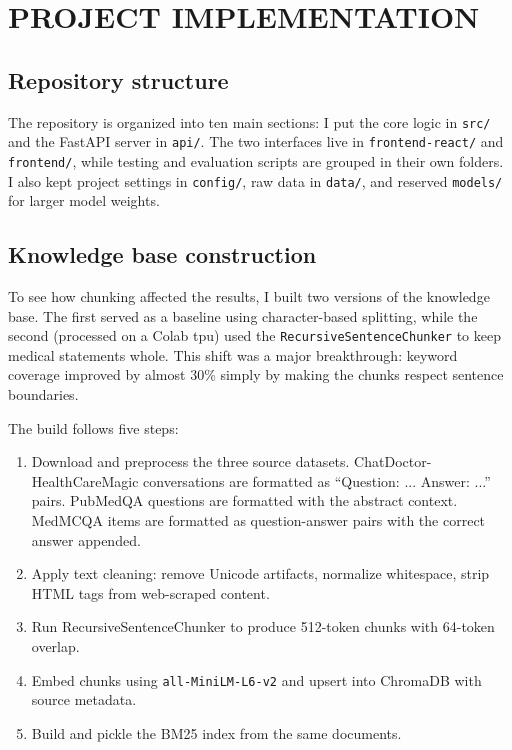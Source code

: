 \chapter{\MakeUppercase{Project Implementation}}

\section{Repository structure}

The repository is organized into ten main sections: 
I put the core logic in \texttt{src/} and the FastAPI server in \texttt{api/}. The two interfaces live in \texttt{frontend-react/} and \texttt{frontend/}, while testing and evaluation scripts are grouped in their own folders. I also kept project settings in \texttt{config/}, raw data in \texttt{data/}, and reserved \texttt{models/} for larger model weights.

\section{Knowledge base construction}

To see how chunking affected the results, I built two versions of the knowledge base. The first served as a baseline using character-based splitting, while the second (processed on a Colab \ac{tpu}) used the \texttt{RecursiveSentenceChunker} to keep medical statements whole. This shift was a major breakthrough: keyword coverage improved by almost 30\% simply by making the chunks respect sentence boundaries.

The build follows five steps:

\begin{enumerate}
    \item Download and preprocess the three source datasets. ChatDoctor-HealthCareMagic conversations are formatted as ``Question: ... Answer: ...'' pairs. PubMedQA questions are formatted with the abstract context. MedMCQA items are formatted as question-answer pairs with the correct answer appended.
    \item Apply text cleaning: remove Unicode artifacts, normalize whitespace, strip HTML tags from web-scraped content.
    \item Run RecursiveSentenceChunker to produce 512-token chunks with 64-token overlap.
    \item Embed chunks using \texttt{all-MiniLM-L6-v2} and upsert into ChromaDB with source metadata.
    \item Build and pickle the BM25 index from the same documents.
\end{enumerate}

